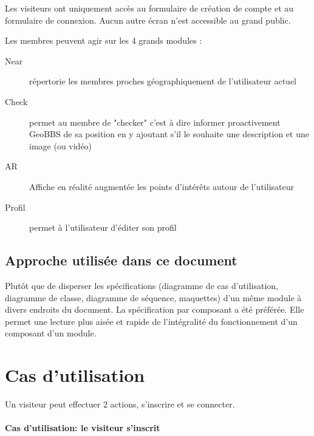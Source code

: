 \documentclass[a4paper,12pt]{report}
\begin{document}
\begin{onehalfspace}
Les visiteurs ont uniquement accès au formulaire de création de compte et au formulaire de connexion. Aucun autre écran n’est accessible au grand public.

Les membres peuvent agir sur les 4 grands modules :
\begin{description}
  \item[Near] répertorie les membres proches géographiquement de l'utilisateur actuel
  \item[Check] permet au membre de "checker" c'est à dire informer proactivement GeoBBS de sa position en y ajoutant s'il le souhaite une description et une image (ou vidéo)
  \item[AR] Affiche en réalité augmentée les points d'intérêts autour de l'utilisateur
  \item[Profil] permet à l'utilisateur d'éditer son profil
\end{description}

\section{Approche utilisée dans ce document} %
\label{sub:approche_utilis_e_dans_ce_document}
Plutôt que de disperser les spécifications (diagramme de cas d’utilisation, diagramme de classe, diagramme de séquence, maquettes) d’un même module à divers endroits du document. La spécification par composant a été préférée. Elle permet une lecture plus aisée et rapide de l’intégralité du fonctionnement d’un composant d’un module.

\label{sub:description_g_n_rale_des_fonctions}

\chapter{Cas d'utilisation}
Un visiteur peut effectuer 2 actions, s’inscrire et se connecter.

\subsubsection{Cas d'utilisation: le visiteur s'inscrit} %

\begin{tabular}{|p{3cm}|p{}|}
\hline %


\end{tabular}
\end{onehalfspace}
\end{document}
